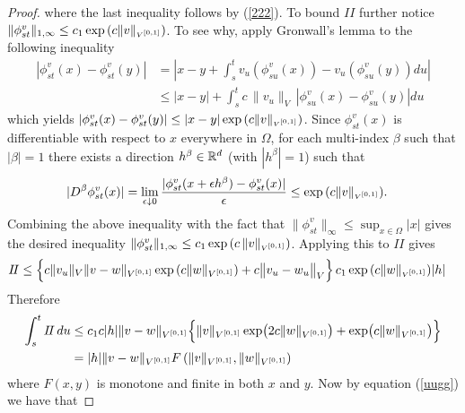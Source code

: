 \documentclass[noinfoline]{imsart}
\begin{document}
\begin{proof}
{} \fi
where the last inequality follows by (\ref{222}). To bound $I\!I$ further notice $
  \|\phi_{st}^v\|_{1,\infty} \leq c_1\exp{\left( c\| v \|_\text{\tiny $V^{[0,1]}$} \right)}$. To see why,
apply Gronwall's lemma to the following inequality
\begin{align*}
|\phi_{st}^v(x) - \phi_{st}^v(y)| &= \left| x-y + \int_{s}^t v_u (\phi_{su}^v(x)) -  v_u (\phi_{su}^v(y)) du\right|\\
& \leq  |x-y| + \int_{s}^t c\, \|v_u\|_{V^{\phantom{[}}} |\phi_{su}^v(x) -  \phi_{su}^v(y)| du
\end{align*}
which yields $| \phi_{st}^v(x) - \phi_{st}^v(y) |\leq |x-y| \exp{\left( c\| v \|_\text{\tiny $V^{[0,1]}$} \right)}$.
  Since $\phi_{st}^v(x)$ is differentiable with respect to $x$ everywhere in $\Omega$, for each multi-index $\beta$ such that $|\beta|=1$ there exists a direction $h^\beta\in \Bbb R^d$ (with $|h^\beta|=1$) such that 
 \begin{align*}
 |D^\beta \phi_{st}^v(x) | &= \lim _{\epsilon \downarrow 0} \frac{|\phi_{st}^v(x+\epsilon h^\beta) - \phi_{st}^v(x)|}{\epsilon}  \leq  \exp{\left( c\| v \|_\text{\tiny $V^{[0,1]}$} \right)}.
 \end{align*} 
 Combining the above inequality with the fact that $ \|\phi_{st}^v\|_\infty \leq \sup_{x\in \Omega} |x| $ gives  the desired inequality 
 $ \|\phi_{st}^v\|_{1,\infty} \leq c_1\exp{\left( c\,\| v \|_\text{\tiny $V^{[0,1]}$} \right)}$. Applying this to $ I\!I $ gives
 \begin{align*}
 I\!I &\leq \Bigl\{  c \| v_u \|_{V}  \|v-w\|_{V^{[0,1]}} \exp\left(c \| w \|_{V^{[0,1]}} \right)   + c \bigl\| v_u-w_u\bigr \|_{V} \Bigr\}\, c_1\exp{\left( c \| w \|_\text{\tiny $V^{[0,1]}$} \right)} |h|
 \end{align*}
 Therefore
 \begin{align*}
\int_s^t I\!I\, du 
&\leq c_1 c |h| \|v-w \|_{V^{[0,1]}}\Bigl\{\|v\|_{V^{[0,1]}} \exp\bigl( 2c\| w \|_{V^{[0,1]}} \bigr)  +  \exp\bigl( c\| w \|_{V^{[0,1]}} \bigr)  \Bigr\}\\
& =  |h|  \|v-w\|_{V^{[0,1]}}  F\left(\|v \|_{V^{[0,1]}} ,\| w\|_{V^{[0,1]}}\right) 
\end{align*}
where $F(x,y)$ is monotone and finite in both $x$ and $y$. Now by equation (\ref{uugg}) we have that 

\end{proof}
\end{document}
